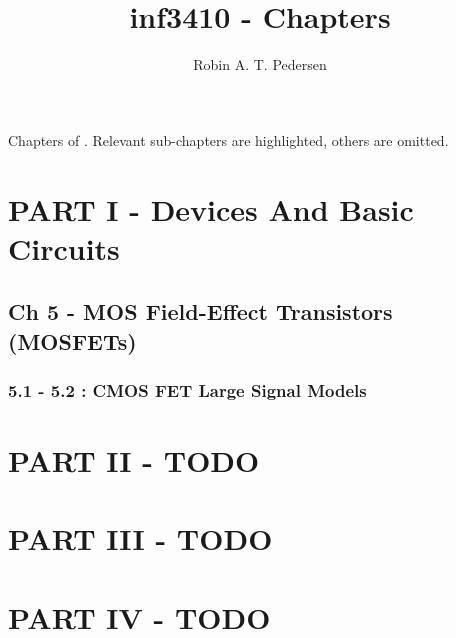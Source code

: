 \documentclass[twocolumn]{article}
\begin{document}
  \title{inf3410 - Chapters}
  \author{Robin A. T. Pedersen}
  \maketitle

  Chapters of \book.
  Relevant sub-chapters are highlighted, others are omitted.
  \section{PART I - Devices And Basic Circuits}
    \subsection{Ch 5 - MOS Field-Effect Transistors (MOSFETs)}
      \subsubsection{5.1 - 5.2 : CMOS FET Large Signal Models}
  \section{PART II - TODO}
  \section{PART III - TODO}
  \section{PART IV - TODO}
\end{document}
